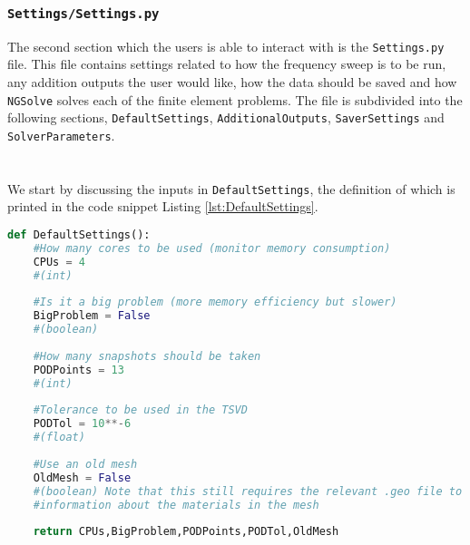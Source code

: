 \subsubsection{\texttt{Settings/Settings.py}}\label{sectSettings.py}
The second section which the users is able to interact with is the \texttt{Settings.py} file. This file contains settings related to how the frequency sweep is to be run, any addition outputs the user would like, how the data should be saved and how \texttt{NGSolve} solves each of the finite element problems. The file is subdivided into the following sections, \texttt{DefaultSettings}, \texttt{AdditionalOutputs}, \texttt{SaverSettings} and \texttt{SolverParameters}.\\
\\
\\
\noindent
We start by discussing the inputs in \texttt{DefaultSettings}, the definition of which is printed in the code snippet Listing \ref{lst:DefaultSettings}.
\clearpage
\begin{lstlisting}[language=Python, caption={DefaultSettings Definition}, label={lst:DefaultSettings}]
def DefaultSettings():
    #How many cores to be used (monitor memory consumption)
    CPUs = 4
    #(int)
    
    #Is it a big problem (more memory efficiency but slower)
    BigProblem = False
    #(boolean)
    
    #How many snapshots should be taken
    PODPoints = 13
    #(int)
    
    #Tolerance to be used in the TSVD
    PODTol = 10**-6
    #(float)
    
    #Use an old mesh
    OldMesh = False
    #(boolean) Note that this still requires the relevant .geo file to obtain
    #information about the materials in the mesh
    
    return CPUs,BigProblem,PODPoints,PODTol,OldMesh
\end{lstlisting}


